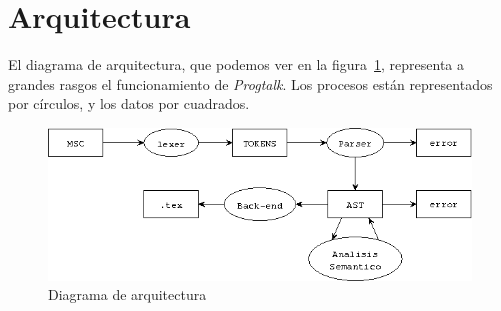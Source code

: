 \section{Arquitectura}

El diagrama de arquitectura, que podemos ver en la
figura~\ref{fig:diagrarquitectura}, representa a grandes rasgos el
funcionamiento de \textit{Progtalk}. Los procesos están representados
por círculos, y los datos por cuadrados.

\begin{figure}
  \includegraphics[scale=0.7]{./images/diag_arquitectura.png}
  \caption{Diagrama de arquitectura}
  \label{fig:diagrarquitectura}
\end{figure}

